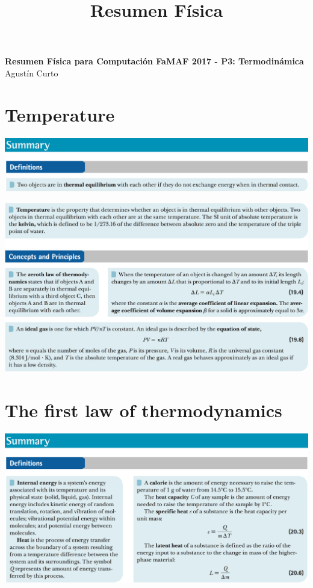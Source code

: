 \documentclass[12pt,a4paper]{article}
\title{Resumen Física}
\newcommand{\N}{\noindent}
\begin{document}
	\begin{center}
		\Huge \textbf{Resumen Física para Computación FaMAF 2017 - P3: Termodinámica}  \\
		\vspace{3mm}
		\large Agustín Curto
	\end{center}

	\section{Temperature}
		\N \includegraphics[scale=.42]{1_a.png}
		
		\vspace{2mm}
		\N \includegraphics[scale=.42]{1_b.png}
		
	\section{The first law of thermodynamics}
		\N \includegraphics[scale=.42]{2_a.png}
		
\end{document}
